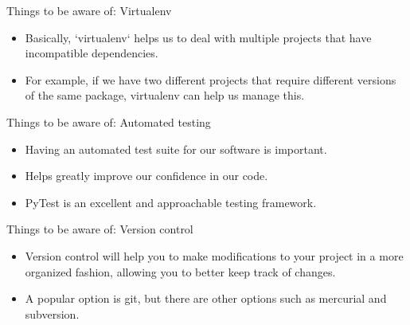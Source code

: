 \documentclass[10pt]{beamer}
\begin{document}
\begin{frame}[fragile]{Things to be aware of: Virtualenv}

  \begin{itemize}
    \item Basically, `virtualenv` helps us to deal with multiple projects that have incompatible dependencies.
    \item For example, if we have two different projects that require different versions of the same package, virtualenv can help us manage this. %
  \end{itemize}
  
\end{frame}

\begin{frame}[fragile]{Things to be aware of: Automated testing}

  \begin{itemize}
    \item Having an automated test suite for our software is important.
    \item Helps greatly improve our confidence in our code.
    \item PyTest is an excellent and approachable testing framework. %
  \end{itemize}

\end{frame}

\begin{frame}[fragile]{Things to be aware of: Version control}

  \begin{itemize}
  \item Version control will help you to make modifications to your project in a more organized fashion, allowing you to better keep track of changes.
  \item A popular option is git, but there are other options such as mercurial and subversion.
  \end{itemize}
  
\end{frame}





\end{document}
